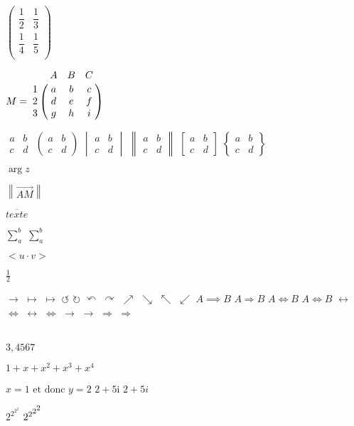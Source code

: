 \documentclass[12pt,a4paper,oneside,twocolumn]{article} %
\numberwithin{equation}{section}
\begin{document}
$\begin{pmatrix}
\dfrac{1}{2} & \dfrac{1}{3} \\[3mm]
\dfrac{1}{4} & \dfrac{1}{5} \\
\end{pmatrix}$

$M=\bordermatrix{
& A & B & C \cr
1& a & b & c \cr
2& d & e & f \cr
3& g & h & i \cr
}$

$\begin{matrix} a&b\\ c&d \end{matrix}$
$\begin{pmatrix} a&b\\ c&d \end{pmatrix}$
$\begin{vmatrix} a&b\\ c&d \end{vmatrix}$
$\begin{Vmatrix} a&b\\ c&d \end{Vmatrix}$
$\begin{bmatrix} a&b\\ c&d \end{bmatrix}$
$\begin{Bmatrix} a&b\\ c&d \end{Bmatrix}$

$\arg z$

$\left\| \overrightarrow{AM} \right\| $

$ \overline{texte} $

$ \sum_a^b$ $ \sum\nolimits_a^b$

$<u\cdot v>$ 

$\frac12$

$\to$ $\mapsto$ $\longmapsto$
$\circlearrowleft$ $\circlearrowright$
$\curvearrowleft$ $\curvearrowright$
$\nearrow$ $\searrow$
$\nwarrow$ $\swarrow$
 $A \implies B$ $A \Rightarrow B$
$A \Longleftrightarrow B$ $A \iff B$
$\leftrightarrow$ $\Leftrightarrow$ $\longleftrightarrow$ 
$\Longleftrightarrow$ 
$\rightarrow$  $\longrightarrow$ $\Rightarrow$ $\Longrightarrow$

  \\
 \qquad $ 3,4567 $

\mbox{$1+x+x^2+x^3+x^4$} %

$x=1 \text{ et donc } y=2$
$\mathrm{2+5i}$ \quad $2+5i$

$2^{2^{2^2}}$
$2^{2^{%
{\scriptstyle {2^{\scriptstyle 2}}}}}$
\end{document}
